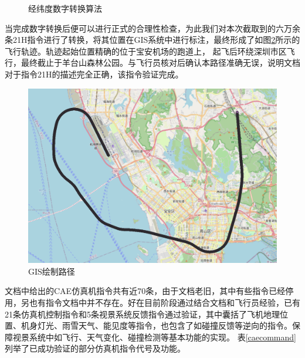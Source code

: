 \begin{figure}[h!]
    \centering
     
    \caption{经纬度数字转换算法}
    \label{llconv}
\end{figure}
\par
当完成数字转换后便可以进行正式的合理性检查，为此我们对本次截取到的六万余条21H指令进行了转换，将其位置在GIS系统中进行标注，最终形成了如图\ref{GIStrace}所示的飞行轨迹。轨迹起始位置精确的位于宝安机场的跑道上，
起飞后环绕深圳市区飞行，最终截止于羊台山森林公园。与飞行员核对后确认本路径准确无误，说明文档对于指令21H的描述完全正确，该指令验证完成。
\begin{figure}[h!]
    \begin{center}
        \includegraphics[width=.9\textwidth]{pictures/trace.png}
        \caption{GIS绘制路径}
        \label{GIStrace}
    \end{center}
\end{figure}
\par
文档中给出的CAE仿真机指令共有近70条，由于文档老旧，其中有些指令已经停用，另也有指令文档中并不存在。好在目前阶段通过结合文档和飞行员经验，已有21条仿真机控制指令和5条视景系统反馈指令通过验证，其中囊括了飞机地理位置、机身灯光、雨雪天气、能见度等指令，也包含了如碰撞反馈等逆向的指令。保障视景系统中如飞行、天气变化、碰撞检测等基本功能的实现。
表\ref{caecommand}列举了已成功验证的部分仿真机指令代号及功能。

